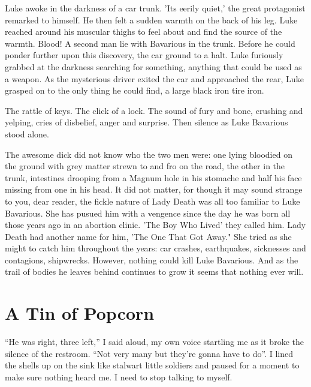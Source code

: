 Luke awoke in the darkness of a car trunk. 'Its eerily quiet,' the
great protagonist remarked to himself. He then felt a sudden warmth
on the back of his leg. Luke reached around his muscular thighs to
feel about and find the source of the warmth. Blood! A second man
lie with Bavarious in the trunk. Before he could ponder further
upon this discovery, the car ground to a halt. Luke furiously
grabbed at the darkness searching for something, anything that
could be used as a weapon. As the mysterious driver exited the car
and approached the rear, Luke grasped on to the only thing he could
find, a large black iron tire iron.



The rattle of keys. The click of a lock. The sound of fury and
bone, crushing and yelping, cries of disbelief, anger and surprise.
Then silence as Luke Bavarious stood alone.



The awesome dick did not know who the two men were: one lying
bloodied on the ground with grey matter strewn to and fro on the
road, the other in the trunk, intestines drooping from a Magnum
hole in his stomache and half his face missing from one in his
head. It did not matter, for though it may sound strange to you,
dear reader, the fickle nature of Lady Death was all too familiar
to Luke Bavarious. She has pusued him with a vengence since the day
he was born all those years ago in an abortion clinic. 'The Boy Who
Lived' they called him. Lady Death had another name for him, 'The
One That Got Away." She tried as she might to catch him throughout
the years: car crashes, earthquakes, sicknesses and contagions,
shipwrecks. However, nothing could kill Luke Bavarious. And as the
trail of bodies he leaves behind continues to grow it seems that
nothing ever will. 
 



\chapter{A Tin of Popcorn}





``He was right, three left,'' I said aloud, my own voice startling me
as it broke the silence of the restroom. ``Not very many but they're
gonna have to do''. I lined the shells up on the sink like stalwart
little soldiers and paused for a moment to make sure nothing heard
me. I need to stop talking to myself.



